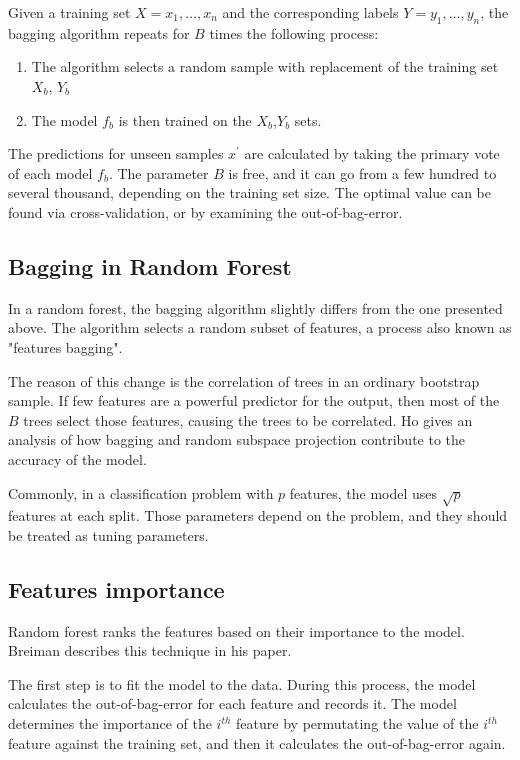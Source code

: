 Given a training set $X = x_1,\dots,x_n$ and the corresponding labels $Y = y_1, \dots, y_n$, the bagging algorithm repeats for $B$ times the following process:
\begin{enumerate}
	\item The algorithm selects a random sample with replacement of the training set $X_b$, $Y_b$
	\item The model $f_b$ is then trained on the $X_b$,$Y_b$ sets.
\end{enumerate}


The predictions for unseen samples $x^\prime$ are calculated by taking the primary vote of each model $f_b$.
The parameter $B$ is free, and it can go from a few hundred to several thousand, depending on the training set size. The optimal value can be found via cross-validation, or by examining the out-of-bag-error. \cite{james2013introduction}

\subsection{Bagging in Random Forest}
In a random forest, the bagging algorithm slightly differs from the one presented above. The algorithm selects a random subset of features, a process also known as "features bagging".

The reason of this change is the correlation of trees in an ordinary bootstrap sample. If few features are a powerful predictor for the output, then most of the $B$ trees select those features, causing the trees to be correlated. Ho gives an analysis of how bagging and random subspace projection contribute to the accuracy of the model. \cite{ho2002data}

Commonly, in a classification problem with $p$ features, the model uses $\sqrt{p}$ features at each split. Those parameters depend on the problem, and they should be treated as tuning parameters. \cite{hastie2009elements}

\subsection{Features importance}
Random forest ranks the features based on their importance to the model. Breiman describes this technique in his paper. \cite{breiman2001random}

The first step is to fit the model to the data. During this process, the model calculates the out-of-bag-error for each feature and records it. The model determines the importance of the $i^{th}$ feature by permutating the value of the $i^{th}$ feature against the training set, and then it calculates the out-of-bag-error again. 

